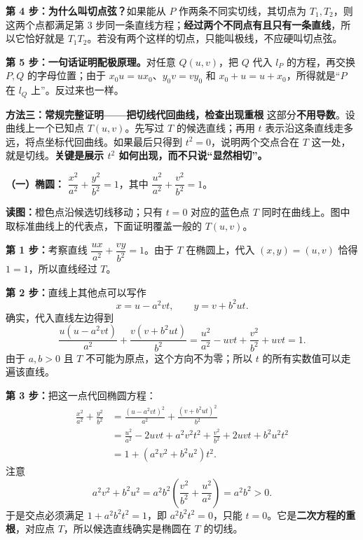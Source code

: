 \begin{proofbox}
\textbf{第 4 步：为什么叫切点弦？}如果能从 $P$ 作两条不同实切线，其切点为 $T_1,T_2$，则这两个点都满足第 3 步同一条直线方程；\textbf{经过两个不同点有且只有一条直线}，所以它恰好就是 $T_1T_2$。若没有两个这样的切点，只能叫极线，不应硬叫切点弦。

\textbf{第 5 步：一句话证明配极原理。}对任意 $Q(u,v)$，把 $Q$ 代入 $l_P$ 的方程，再交换 $P,Q$ 的字母位置；由于 $x_0u=ux_0$、$y_0v=vy_0$ 和 $x_0+u=u+x_0$，所得就是“$P$ 在 $l_Q$ 上”。反过来也一样。

\medskip
\begin{samepage}
\textbf{\textcolor{CProof}{方法三：常规完整证明——把切线代回曲线，检查出现重根}}
这部分\textbf{不用导数}。设曲线上一个已知点 $T(u,v)$。先写过 $T$ 的候选直线；再用 $t$ 表示沿这条直线走多远，将点坐标代回曲线。如果最后只得到 $t^2=0$，说明两个交点合在 $T$ 这一处，就是切线。\textbf{关键是展示 $t^2$ 如何出现，而不只说“显然相切”。}

\textbf{（一）椭圆：}\; $\dfrac{x^2}{a^2}+\dfrac{y^2}{b^2}=1$，其中 $\dfrac{u^2}{a^2}+\dfrac{v^2}{b^2}=1$。
\begin{center}\end{center}
\noindent\textbf{读图：}橙色点沿候选切线移动；只有 $t=0$ 对应的蓝色点 $T$ 同时在曲线上。图中取标准曲线上的代表点，下面证明覆盖一般的 $T(u,v)$。
\end{samepage}

\textbf{第 1 步：}考察直线 $\dfrac{ux}{a^2}+\dfrac{vy}{b^2}=1$。由于 $T$ 在椭圆上，代入 $(x,y)=(u,v)$ 恰得 $1=1$，所以直线经过 $T$。

\textbf{第 2 步：}直线上其他点可以写作
\[
x=u-a^2vt,\qquad y=v+b^2ut.
\]
确实，代入直线左边得到
\[
\frac{u(u-a^2vt)}{a^2}+\frac{v(v+b^2ut)}{b^2}
=\frac{u^2}{a^2}-uvt+\frac{v^2}{b^2}+uvt=1.
\]
由于 $a,b>0$ 且 $T$ 不可能为原点，这个方向不为零；所以 $t$ 的所有实数值可以走遍该直线。

\textbf{第 3 步：}把这一点代回椭圆方程：
\[
\begin{aligned}
\frac{x^2}{a^2}+\frac{y^2}{b^2}
&=\frac{(u-a^2vt)^2}{a^2}+\frac{(v+b^2ut)^2}{b^2}\\
&=\frac{u^2}{a^2}-2uvt+a^2v^2t^2+\frac{v^2}{b^2}+2uvt+b^2u^2t^2\\
&=1+(a^2v^2+b^2u^2)t^2.
\end{aligned}
\]
注意
\[
a^2v^2+b^2u^2=a^2b^2\left(\frac{v^2}{b^2}+\frac{u^2}{a^2}\right)=a^2b^2>0.
\]
于是交点必须满足 $1+a^2b^2t^2=1$，即 $a^2b^2t^2=0$，只能 $t=0$。它是\textbf{二次方程的重根}，对应点 $T$，所以候选直线确实是椭圆在 $T$ 的切线。


\end{proofbox}

